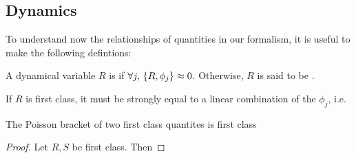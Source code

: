 \documentclass{article}
\begin{document}
\subsection{Dynamics}

To understand now the relationships of quantities in our formalism, it is useful to make the following defintions:

\begin{definition}
A dynamical variable $R$ is  if $\forall j, \, \acomm[R]{\phi_j}\approx 0$. Otherwise, $R$ is said to be .
\end{definition}

If $R$ is first class, it must be strongly equal to a linear combination of the $\phi_j$, i.e. 

\begin{theorem}
The Poisson bracket of two first class quantites is first class
\end{theorem}
\begin{proof}
Let $R,S$ be first class. Then 
\end{proof}
\end{document}
